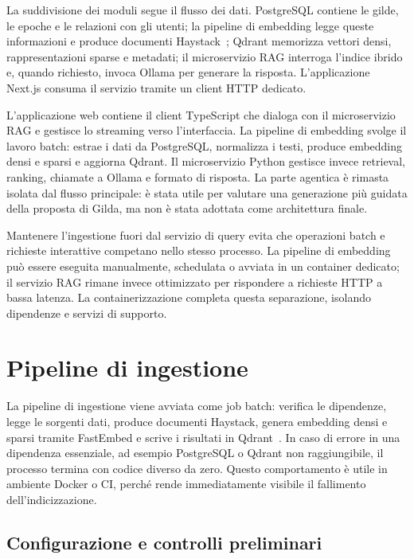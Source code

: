 La suddivisione dei moduli segue il flusso dei dati. PostgreSQL contiene le
gilde, le epoche e le relazioni con gli utenti; la pipeline di embedding legge
queste informazioni e produce documenti Haystack~\cite{haystack2023}; Qdrant
memorizza vettori densi, rappresentazioni sparse e metadati; il microservizio
RAG interroga l'indice ibrido e, quando richiesto, invoca Ollama per generare la
risposta. L'applicazione Next.js consuma il servizio tramite un client HTTP
dedicato.

L'applicazione web contiene il client TypeScript che dialoga con il
microservizio RAG e gestisce lo streaming verso l'interfaccia. La pipeline di
embedding svolge il lavoro batch: estrae i dati da PostgreSQL, normalizza i
testi, produce embedding densi e sparsi e aggiorna Qdrant. Il microservizio
Python gestisce invece retrieval, ranking, chiamate a Ollama e formato di
risposta. La parte agentica è rimasta isolata dal flusso principale: è stata
utile per valutare una generazione più guidata della proposta di Gilda, ma non
è stata adottata come architettura finale.

Mantenere l'ingestione fuori dal servizio di query evita che operazioni batch e
richieste interattive competano nello stesso processo. La pipeline di embedding
può essere eseguita manualmente, schedulata o avviata in un container dedicato;
il servizio RAG rimane invece ottimizzato per rispondere a richieste HTTP a
bassa latenza. La containerizzazione completa questa separazione, isolando
dipendenze e servizi di supporto.

\section{Pipeline di ingestione}
\label{sec:implementation_ingestion}

La pipeline di ingestione viene avviata come job batch: verifica le dipendenze,
legge le sorgenti dati, produce documenti Haystack, genera embedding densi e
sparsi tramite FastEmbed e scrive i risultati in
Qdrant~\cite{haystack2023,qdrant2023}. In
caso di errore in una dipendenza essenziale, ad esempio PostgreSQL o Qdrant non
raggiungibile, il processo termina con codice diverso da zero. Questo comportamento
è utile in ambiente Docker o CI, perché rende immediatamente visibile il fallimento
dell'indicizzazione.

\subsection{Configurazione e controlli preliminari}
\label{subsec:implementation_ingestion_config}

